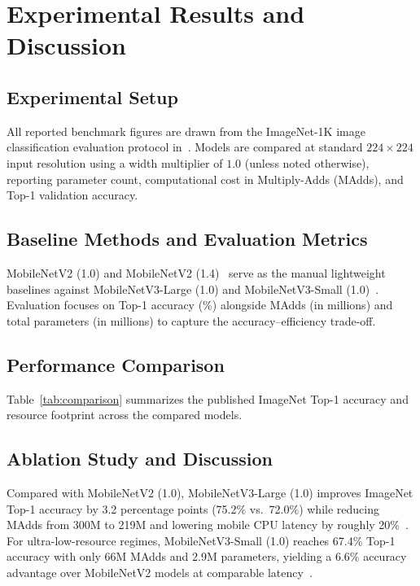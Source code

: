 \section{Experimental Results and Discussion}\label{sec:experiments}
\subsection{Experimental Setup}
All reported benchmark figures are drawn from the ImageNet-1K image classification evaluation protocol in~\cite{howard2019mobilenetv3,sandler2018mobilenetv2}.
Models are compared at standard $224 \times 224$ input resolution using a width multiplier of $1.0$ (unless noted otherwise), reporting parameter count, computational cost in Multiply-Adds (MAdds), and Top-1 validation accuracy.

\subsection{Baseline Methods and Evaluation Metrics}
MobileNetV2 (1.0) and MobileNetV2 (1.4)~\cite{sandler2018mobilenetv2} serve as the manual lightweight baselines against MobileNetV3-Large (1.0) and MobileNetV3-Small (1.0)~\cite{howard2019mobilenetv3}.
Evaluation focuses on Top-1 accuracy (\%) alongside MAdds (in millions) and total parameters (in millions) to capture the accuracy--efficiency trade-off.

\subsection{Performance Comparison}
Table~\ref{tab:comparison} summarizes the published ImageNet Top-1 accuracy and resource footprint across the compared models.


\subsection{Ablation Study and Discussion}
Compared with MobileNetV2 (1.0), MobileNetV3-Large (1.0) improves ImageNet Top-1 accuracy by 3.2 percentage points (75.2\% vs.\ 72.0\%) while reducing MAdds from 300M to 219M and lowering mobile CPU latency by roughly 20\%~\cite{howard2019mobilenetv3}.
For ultra-low-resource regimes, MobileNetV3-Small (1.0) reaches 67.4\% Top-1 accuracy with only 66M MAdds and 2.9M parameters, yielding a 6.6\% accuracy advantage over MobileNetV2 models at comparable latency~\cite{howard2019mobilenetv3}.
